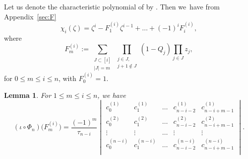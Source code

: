 \documentclass[10pt,a4paper]{amsart}
\numberwithin{equation}{section}
\newtheorem{Lemma}[Theorem]{Lemma}
\theoremstyle{definition}
\begin{document}
Let us denote
the characteristic polynomial of 
by
.
Then we~have from Appendix~\ref{sec:F}
\[
\chi_i(\zeta)=
\zeta^i-F^{(i)}_1\zeta^{i-1}+\dots+(-1)^{i}F^{(i)}_i,
\]
where
\begin{equation}
\label{eq:Fij}
F_m^{(i)}:=\sum_{\substack{J\subset [i]\\ |J|=m}}
\prod_{\substack{j\in J,\\j+1\notin J}}
(1-Q_j)\prod_{j\in J}z_j,
\end{equation}
for
$0\le m\le i\le n$, with $F_0^{(i)}=1$.

\begin{Lemma}\label{lem:SF_to_c}
For $1\le m\le i\le n$, we have
\[
(\iota\circ\Phi_n )\bigl(F^{(i)}_m\bigr)=\frac{(-1)^{m}}{\tau_{n-i}}
\begin{vmatrix}
c^{(1)}_{0} & c^{(1)}_{1} & \dots & c^{(1)}_{n-i-2}&c^{(1)}_{n-i+m-1}\\
c^{(2)}_{0} & c^{(2)}_{1} & \dots & c^{(2)}_{n-i-2}&c^{(2)}_{n-i+m-1}\\
\vdots & \vdots & \dots & \vdots &\vdots\\
c^{(n-i)}_{0} & c^{(n-i)}_{1} & \dots & c^{(n-i)}_{n-i-2}&c^{(n-i)}_{n-i+m-1}\\
\end{vmatrix}.
\]
\end{Lemma}
\end{document}
